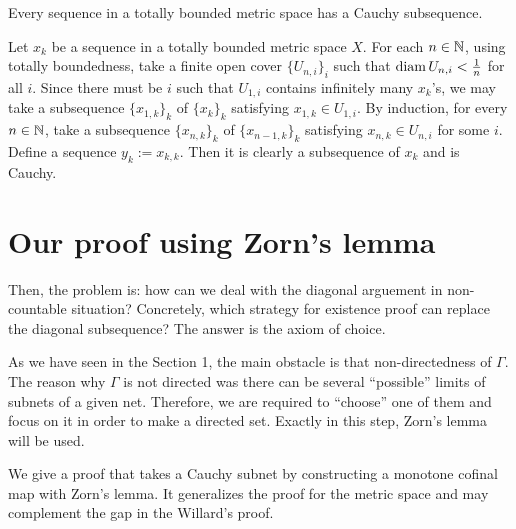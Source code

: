 \documentclass{../exp}
\begin{document}
\begin{thm}
Every sequence in a totally bounded metric space has a Cauchy subsequence.
\end{thm}
\begin{pf}
Let $x_k$ be a sequence in a totally bounded metric space $X$.
For each $n\in\mathbb{N}$, using totally boundedness, take a finite open cover $\{U_{n,i}\}_i$ such that $\operatorname{diam} U_{n,i}<\frac1n$ for all $i$.
Since there must be $i$ such that $U_{1,i}$ contains infinitely many $x_k$'s, we may take a subsequence $\{x_{1,k}\}_k$ of $\{x_k\}_k$ satisfying $x_{1,k}\in U_{1,i}$.
By induction, for every $n\in\mathbb{N}$, take a subsequence $\{x_{n,k}\}_k$ of $\{x_{n-1,k}\}_k$ satisfying $x_{n,k}\in U_{n,i}$ for some $i$.
Define a sequence $y_k:=x_{k,k}$.
Then it is clearly a subsequence of $x_k$ and is Cauchy.
\end{pf}






\section{Our proof using Zorn's lemma}

Then, the problem is: how can we deal with the diagonal arguement in non-countable situation?
Concretely, which strategy for existence proof can replace the diagonal subsequence?
The answer is the axiom of choice.

As we have seen in the Section 1, the main obstacle is that non-directedness of $\Gamma$.
The reason why $\Gamma$ is not directed was there can be several ``possible'' limits of subnets of a given net.
Therefore, we are required to ``choose'' one of them and focus on it in order to make a directed set.
Exactly in this step, Zorn's lemma will be used.
 
We give a proof that takes a Cauchy subnet by constructing a monotone cofinal map with Zorn's lemma.
It generalizes the proof for the metric space and may complement the gap in the Willard's proof.
\end{document}
